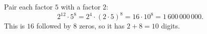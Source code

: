 Pair each factor $5$ with a factor $2$:
\[
2^{12}\cdot5^8=2^4\cdot(2\cdot5)^8=16\cdot10^8=1\,600\,000\,000 .
\]
This is $16$ followed by $8$ zeros, so it has $2+8=\boxed{10}$ digits.
